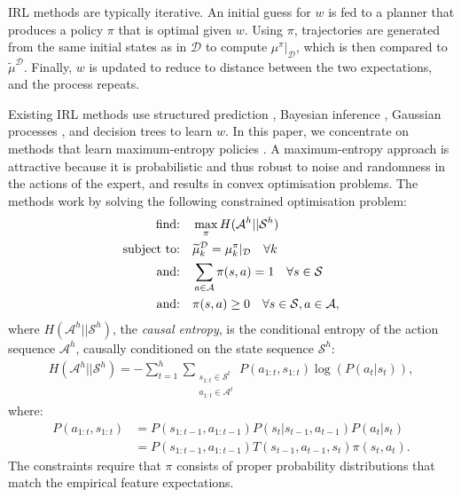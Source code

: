 \documentclass{aamas2016}
\begin{document}
IRL methods are typically iterative. An initial guess for $w$ is fed to a planner that produces a policy $\pi$ that is optimal given $w$.  Using $\pi$, trajectories are generated from the same initial states as in $\mathcal{D}$ to compute $\mu^{\pi}|_{\mathcal{D}}$, which is then compared to $\widetilde{\mu}^{\mathcal{D}}$.  Finally, $w$ is updated to reduce to distance between the two expectations, and the process repeats.

Existing IRL methods use structured prediction \cite{ratliff2006maximum}, Bayes\-ian inference \cite{ramachandran2007bayesian,dimitrakakis2012bayesian}, Gaussian processes \cite{levine2011nonlinear}, and decision trees \cite{ratliff2007boosting} to learn $w$.  In this paper, we concentrate on methods that learn maximum-entropy policies \cite{ziebart2008maximum,ziebart2010modelingthesis}.  A maximum-entropy approach is attractive because it is probabilistic and thus robust to noise and randomness in the actions of the expert, and results in convex optimisation problems. The methods work by solving the following constrained optimisation problem:
\begin{align}
	\hbox{find:} &\quad\max\limits_{\pi} H(\mathcal{A}^h||\mathcal{S}^h)\label{eq:primal_obj}\\
\hbox{subject to:}&\quad\widetilde{\mu}^{\mathcal{D}}_k   = \mu^{\pi}_k|_{\mathcal{D}}\quad\forall k \label{eq:features_equality_constraint}\\
\hbox{and:} &\quad\sum_{a\in\mathcal{A}}\pi(s,a)  = 1\quad\forall s\in\mathcal{S}\\
\hbox{and:} &\quad\pi(s,a) \geq 0\quad\forall s\in\mathcal{S},a\in\mathcal{A},\label{eq:positive_policy}
\end{align}
where $H(\mathcal{A}^h||\mathcal{S}^h)$, the \emph{causal entropy}, is the conditional entropy of the action sequence $\mathcal{A}^h$, causally conditioned on the state sequence $\mathcal{S}^h$:
\begin{align}
H(\mathcal{A}^h||\mathcal{S}^h) = -\sum_{t=1}^h \sum_{\substack{s_{1:t}\in\mathcal{S}^t\\a_{1:t}\in\mathcal{A}^t}} P(a_{1:t},s_{1:t})\log(P(a_t|s_t)),
\label{eg:entdef}
\end{align}
where:
\begin{align*}
  P(a_{1:t},s_{1:t})&= P(s_{1:t-1},a_{1:t-1})P(s_t|s_{t-1},a_{t-1})P(a_t|s_t)\\
  &=P(s_{1:t-1},a_{1:t-1})T(s_{t-1},a_{t-1},s_t)\pi(s_t,a_t).
\end{align*}
The constraints require that $\pi$ consists of proper probability distributions that match the empirical feature expectations.
\end{document}
